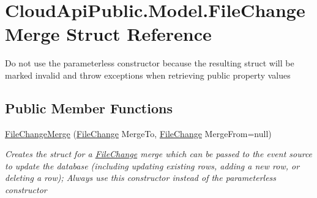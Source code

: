 \hypertarget{struct_cloud_api_public_1_1_model_1_1_file_change_merge}{\section{Cloud\-Api\-Public.\-Model.\-File\-Change\-Merge Struct Reference}
\label{struct_cloud_api_public_1_1_model_1_1_file_change_merge}
}


Do not use the parameterless constructor because the resulting struct will be marked invalid and throw exceptions when retrieving public property values  


\subsection*{Public Member Functions}
\begin{DoxyCompactItemize}
\item 
\hyperlink{struct_cloud_api_public_1_1_model_1_1_file_change_merge_ad841a9bbfbc41d406dabe10167b750ad}{File\-Change\-Merge} (\hyperlink{class_cloud_api_public_1_1_model_1_1_file_change}{File\-Change} Merge\-To, \hyperlink{class_cloud_api_public_1_1_model_1_1_file_change}{File\-Change} Merge\-From=null)
\begin{DoxyCompactList}\small\item\em Creates the struct for a \hyperlink{class_cloud_api_public_1_1_model_1_1_file_change}{File\-Change} merge which can be passed to the event source to update the database (including updating existing rows, adding a new row, or deleting a row); Always use this constructor instead of the parameterless constructor \end{DoxyCompactList}\end{DoxyCompactItemize}
